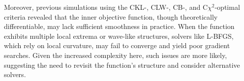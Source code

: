 \hspace*{8mm} Moreover, previous simulations using the CKL-, CLW-, CB-, and C$\chi^2$-optimal criteria revealed that the inner objective function, though theoretically differentiable, may lack sufficient smoothness in practice. When the function exhibits multiple local extrema or wave-like structures, solvers like L-BFGS, which rely on local curvature, may fail to converge and yield poor gradient searches. Given the increased complexity here, such issues are more likely, suggesting the need to revisit the function’s structure and consider alternative solvers.








